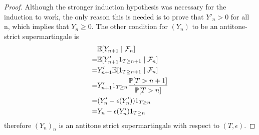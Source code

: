 \begin{proof}
Although the stronger induction hypothesis was necessary for the induction to work, the only reason this is needed is to prove that $Y'_n > 0$ for all n, which implies that $Y_n \geq 0$. The other condition for $(Y_n)$ to be an antitone-strict supermartingale is  \\
\begin{align*}
    & \mathbb{E}[Y_{n+1} \mid \mathcal F_n] \\
    = & \mathbb{E}[Y'_{n+1} 1_{T \geq n+1} \mid \mathcal F_n] \\
    = & Y'_{n+1} \mathbb{E}[1_{T \geq n+1} \mid \mathcal F_n] \\ 
    = & Y'_{n+1} 1_{T \geq n} \frac{\mathbb P[T > n+1]}{\mathbb P[T > n]} \\
    = & (Y'_n - \epsilon(Y'_n)) 1_{T \geq n} \\
    = & Y_n - \epsilon(Y'_n) 1_{T \geq n}
\end{align*}
therefore $(Y_n)_n$ is an antitone strict supermartingale with respect to $(T,\epsilon)$.
\end{proof}




